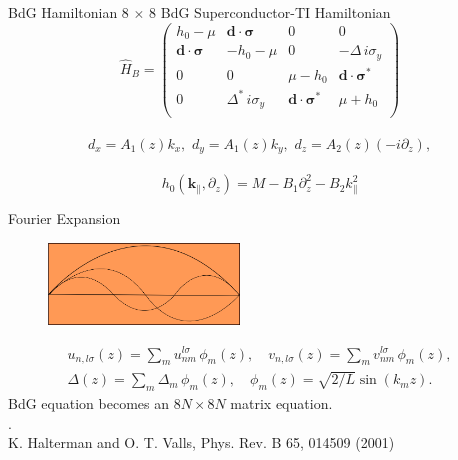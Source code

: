 \documentclass[]{beamer}
\begin{document}
\begin{frame}{BdG Hamiltonian}
8 $\times$ 8 BdG Superconductor-TI Hamiltonian
\begin{equation*}
\hat{H}_{B}=\left( \begin{array}{cccc}
h_0 -\mu  & \mathbf{d} \cdot \boldsymbol{\sigma}&0&0\\ 
 \mathbf{d} \cdot \boldsymbol{\sigma} &-h_0 -\mu &0&-\Delta\, i\sigma_y\\ 
0 &0& \mu -h_0 & \mathbf{d} \cdot \boldsymbol{\sigma}^* \\
0 &\Delta^{\ast} \, i\sigma_y & \mathbf{d} \cdot \boldsymbol{\sigma}^* & \mu+h_0\\ 
 \end{array} \right)
\end{equation*}\\
\begin{equation*}
d_x=A_1(z)k_x,\,\, d_y=A_1(z)k_y,\,\, d_z=A_2(z)(-i\partial_z),
\end{equation*} \\
\begin{equation*}
h_0(\mathbf{k}_\parallel, \partial_z)=M -B_1 \partial_z^2 -B_2 k_\parallel^2
\end{equation*} 
\end{frame}


\begin{frame}{Fourier Expansion}
\begin{figure}
\includegraphics[width=2in]{include/particlebox.png}
\end{figure}
\begin{align*}
u_{n,l\sigma}(z) = \sum_m u_{nm}^{l \sigma}\,\phi_m(z),\quad 
v_{n,l\sigma}(z) = \sum_m v_{nm}^{l \sigma}\, \phi_m(z),\\
\Delta(z) = \sum_m \Delta_{m}\, \phi_m(z) ,\quad 
\phi_m(z)=\sqrt{2/L}\sin(k_m z).
\end{align*}
BdG equation becomes an $8N \times 8N$ matrix equation. \\.\\
K. Halterman and O. T. Valls, Phys. Rev. B 65,  014509 (2001)\\
\end{frame}
\end{document}
